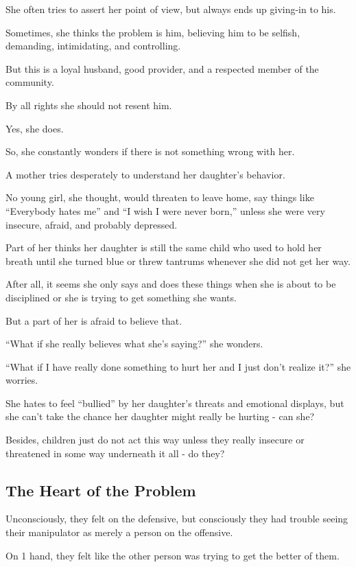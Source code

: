 \documentclass[oneside]{book}
\numberwithin{equation}{section}
\begin{document}
She often tries to assert her point of view, but always ends up giving-in to his.

Sometimes, she thinks the problem is him, believing him to be selfish, demanding, intimidating, and controlling.

But this is a loyal husband, good provider, and a respected member of the community.

By all rights she should not resent him.

Yes, she does.

So, she constantly wonders if there is not something wrong with her.

%
A mother tries desperately to understand her daughter's behavior.

No young girl, she thought, would threaten to leave home, say things like ``Everybody hates me'' and ``I wish I were never born,'' unless she were very insecure, afraid, and probably depressed.

Part of her thinks her daughter is still the same child who used to hold her breath until she turned blue or threw tantrums whenever she did not get her way.

After all, it seems she only says and does these things when she is about to be disciplined or she is trying to get something she wants.

But a part of her is afraid to believe that.

``What if she really believes what she's saying?'' she wonders.

``What if I have really done something to hurt her and I just don't realize it?'' she worries.

She hates to feel ``bullied'' by her daughter's threats and emotional displays, but she can't take the chance her daughter might really be hurting - can she?

Besides, children just do not act this way unless they really insecure or threatened in some way underneath it all - do they?

\subsection*{The Heart of the Problem}

Unconsciously, they felt on the defensive, but consciously they had trouble seeing their manipulator as merely a person on the offensive.

On 1 hand, they felt like the other person was trying to get the better of them.
\end{document}

